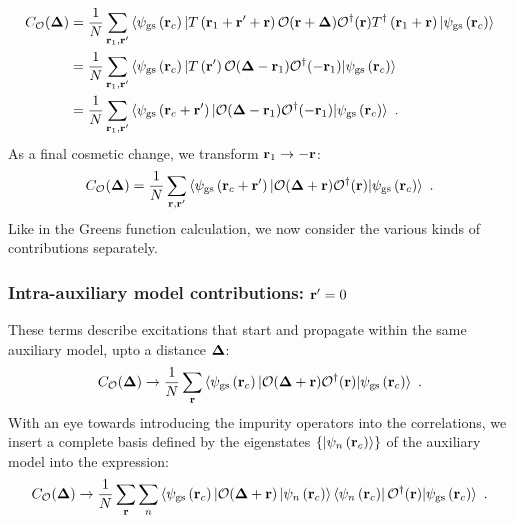 \documentclass[reprint,hidelinks,onecolumn]{revtex4-2}
\begin{document}
\begin{equation}\begin{aligned}
	C_{\mathcal{O}}({\bf \Delta}) &= \frac{1}{N}\sum_{{\bf r}_1,{\bf r}^\prime}\braket{\psi_\text{gs}\left({\bf r}_c\right) | T\left({\bf r}_1 + {\bf r}^\prime + {\bf r}\right) \mathcal{O}({\bf r} + {\bf \Delta})\mathcal{O}^\dagger({\bf r}) T^\dagger\left({\bf r}_1 + {\bf r}\right) | \psi_\text{gs}\left({\bf r}_c\right)}\\
								  &= \frac{1}{N}\sum_{{\bf r}_1,{\bf r}^\prime}\braket{\psi_\text{gs}\left({\bf r}_c\right) | T\left({\bf r}^\prime\right) \mathcal{O}({\bf \Delta} - {\bf r}_1) \mathcal{O}^\dagger(- {\bf r}_1) | \psi_\text{gs}\left({\bf r}_c\right)}\\
								  &= \frac{1}{N}\sum_{{\bf r}_1,{\bf r}^\prime}\braket{\psi_\text{gs}\left({\bf r}_c + {\bf r}^\prime\right) | \mathcal{O}({\bf \Delta} - {\bf r}_1) \mathcal{O}^\dagger(- {\bf r}_1) | \psi_\text{gs}\left({\bf r}_c\right)}~.
\end{aligned}\end{equation}
As a final cosmetic change, we transform \({\bf r}_1 \to -{\bf r}\):
\begin{equation}\begin{aligned}
	C_{\mathcal{O}}({\bf \Delta}) = \frac{1}{N}\sum_{{\bf r},{\bf r}^\prime}\braket{\psi_\text{gs}\left({\bf r}_c + {\bf r}^\prime\right) | \mathcal{O}({\bf \Delta} + {\bf r}) \mathcal{O}^\dagger({\bf r}) | \psi_\text{gs}\left({\bf r}_c\right)}~.
\end{aligned}\end{equation}
Like in the Greens function calculation, we now consider the various kinds of contributions separately.

\subsubsection{Intra-auxiliary model contributions: \({\bf r}^\prime = 0\)}
These terms describe excitations that start and propagate within the same auxiliary model, upto a distance \({\bf \Delta}\):
\begin{equation}\begin{aligned}
	C_{\mathcal{O}}({\bf \Delta}) \to \frac{1}{N}\sum_{{\bf r}}\braket{\psi_\text{gs}\left({\bf r}_c\right) | \mathcal{O}({\bf \Delta} + {\bf r})\mathcal{O}^\dagger({\bf r}) | \psi_\text{gs}\left({\bf r}_c\right)}~.
\end{aligned}\end{equation}
With an eye towards introducing the impurity operators into the correlations, we insert a complete basis defined by the eigenstates \(\left\{\ket{\psi_n\left({\bf r}_c\right)}\right\} \) of the auxiliary model into the expression:
\begin{equation}\begin{aligned}
	C_{\mathcal{O}}({\bf \Delta}) \to \frac{1}{N}\sum_{{\bf r}}\sum_{n}\braket{\psi_\text{gs}\left({\bf r}_c\right) | \mathcal{O}({\bf \Delta} + {\bf r}) \ket{\psi_n\left({\bf r}_c\right)}\bra{\psi_n\left({\bf r}_c\right)} \mathcal{O}^\dagger({\bf r}) | \psi_\text{gs}\left({\bf r}_c\right)}~.
\end{aligned}\end{equation}
\end{document}
